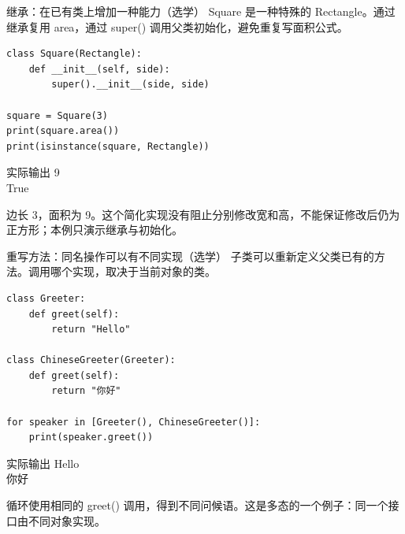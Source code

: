 \documentclass[9pt]{ctexbeamer}
\begin{document}
\begin{frame}[fragile]{继承：在已有类上增加一种能力（选学）}
Square 是一种特殊的 Rectangle。通过继承复用 area，通过 super() 调用父类初始化，避免重复写面积公式。
\begin{lstlisting}
class Square(Rectangle):
    def __init__(self, side):
        super().__init__(side, side)

square = Square(3)
print(square.area())
print(isinstance(square, Rectangle))
\end{lstlisting}
\begin{exampleblock}{实际输出}
{\ttfamily\small 9\\
True}
\end{exampleblock}
\small 边长 3，面积为 9。这个简化实现没有阻止分别修改宽和高，不能保证修改后仍为正方形；本例只演示继承与初始化。
\par{}

\end{frame}

\begin{frame}[fragile]{重写方法：同名操作可以有不同实现（选学）}
子类可以重新定义父类已有的方法。调用哪个实现，取决于当前对象的类。
\begin{lstlisting}
class Greeter:
    def greet(self):
        return "Hello"

class ChineseGreeter(Greeter):
    def greet(self):
        return "你好"

for speaker in [Greeter(), ChineseGreeter()]:
    print(speaker.greet())
\end{lstlisting}
\begin{exampleblock}{实际输出}
{\ttfamily\small Hello\\
你好}
\end{exampleblock}
\small 循环使用相同的 greet() 调用，得到不同问候语。这是多态的一个例子：同一个接口由不同对象实现。
\par{}

\end{frame}
\end{document}
